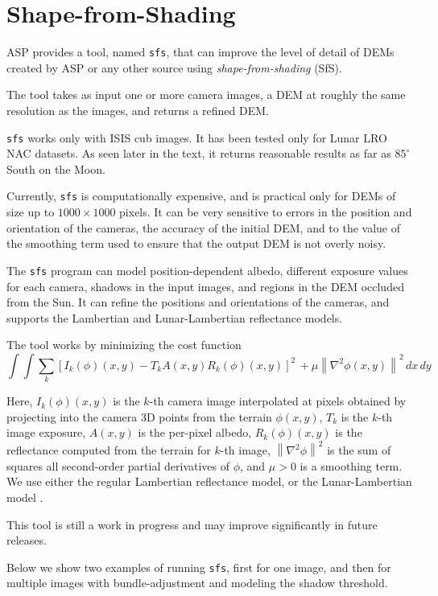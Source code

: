 \chapter{Shape-from-Shading}
\label{ch:sfs}

ASP provides a tool, named \texttt{sfs}, that can improve the level of
detail of DEMs created by ASP or any other source using
\textit{shape-from-shading} (SfS).

The tool takes as input one or more camera images, a DEM at roughly the
same resolution as the images, and returns a refined DEM.

\texttt{sfs} works only with ISIS cub images. It has been tested only
for Lunar LRO NAC datasets. As seen later in the text, it returns reasonable
results as far as $85^\circ$ South on the Moon.

Currently, \texttt{sfs} is computationally expensive, and is practical
only for DEMs of size up to $1000\times 1000$ pixels. It can be very
sensitive to errors in the position and orientation of the cameras, the
accuracy of the initial DEM, and to the value of the smoothing term used
to ensure that the output DEM is not overly noisy.

The \texttt{sfs} program can model position-dependent albedo, different
exposure values for each camera, shadows in the input images, and regions
in the DEM occluded from the Sun. It can refine the positions and orientations
of the cameras, and supports the Lambertian and Lunar-Lambertian reflectance
models.

The tool works by minimizing the cost function
$$
\int\!\! \int \! \sum_k \left[ I_k(\phi)(x, y) - T_k A(x, y)
  R_k(\phi)(x, y) \right]^2\, + \mu
\left\|\nabla^2 \phi(x, y) \right\|^2 \, dx\, dy
$$

Here, $I_k(\phi)(x, y)$ is the $k$-th camera image interpolated at
pixels obtained by projecting into the camera 3D points from the terrain
$\phi(x, y)$, $T_k$ is the $k$-th image exposure, $A(x, y)$ is the
per-pixel albedo, $R_k(\phi)(x, y)$ is the reflectance computed from the
terrain for $k$-th image, $\left\|\nabla^2 \phi \right\|^2 $ is the sum
of squares all second-order partial derivatives of $\phi$, and $\mu > 0$
is a smoothing term. We use either the regular Lambertian reflectance model,
or the Lunar-Lambertian model \cite{mcewen1991photometric}.

This tool is still a work in progress and may improve significantly in
future releases.

Below we show two examples of running \texttt{sfs}, first for one image,
and then for multiple images with bundle-adjustment and modeling the shadow
threshold.

